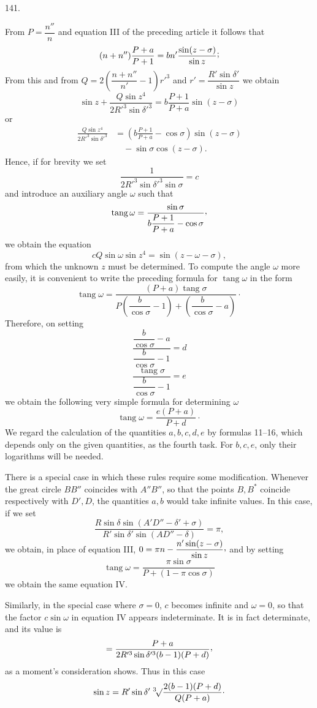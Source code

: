 \par{}\medskip
\begin{center}\hypertarget{native-189-article141}{}141.\end{center}
From $P=\dfrac{n''}{n}$ and equation III of the preceding article it follows that
\[
(n+n'')\frac{P+a}{P+1}=bn'\frac{\sin(z-\sigma)}{\sin z}\mathpunct{\raisebox{.45ex}{;}}
\]
From this and from $Q=2\left(\dfrac{n+n''}{n'}-1\right)r'^3$ and $r'=\dfrac{R'\sin\delta'}{\sin z}$ we obtain
\[
\sin z+\frac{Q\sin z^4}{2R'^3\sin\delta'^3}=b\frac{P+1}{P+a}\sin(z-\sigma)
\]
or
\[
\begin{aligned}
\frac{Q\sin z^4}{2R'^3\sin\delta'^3}&=\left(b\frac{P+1}{P+a}-\cos\sigma\right)\sin(z-\sigma)\\[.5ex]
&\quad-\sin\sigma\cos(z-\sigma).
\end{aligned}
\]
Hence, if for brevity we set
\[
\tag*{14)}\frac{1}{2R'^3\sin\delta'^3\sin\sigma}=c
\]
and introduce an auxiliary angle $\omega$ such that
\[
\operatorname{tang}\omega=\frac{\sin\sigma}{b\dfrac{P+1}{P+a}-\cos\sigma}\mathpunct{\raisebox{.45ex}{,}}
\]
we obtain the equation
\[
\tag*{IV.}cQ\sin\omega\sin z^4=\sin(z-\omega-\sigma),
\]
from which the unknown $z$ must be determined. To compute the angle $\omega$ more easily, it is convenient to write the preceding formula for $\operatorname{tang}\omega$ in the form
\[
\operatorname{tang}\omega=\frac{(P+a)\operatorname{tang}\sigma}{P\left(\dfrac{b}{\cos\sigma}-1\right)+\left(\dfrac{b}{\cos\sigma}-a\right)}\mathpunct{\cdot}
\]
Therefore, on setting
\[
\tag*{15)}\frac{\dfrac{b}{\cos\sigma}-a}{\dfrac{b}{\cos\sigma}-1}=d
\]
\[
\tag*{16)}\frac{\operatorname{tang}\sigma}{\dfrac{b}{\cos\sigma}-1}=e
\]
we obtain the following very simple formula for determining $\omega$
\[
\operatorname{tang}\omega=\frac{e(P+a)}{P+d}\mathpunct{\cdot}
\]
We regard the calculation of the quantities $a,b,c,d,e$ by formulas 11–16, which depends only on the given quantities, as the fourth task. For $b,c,e$, only their logarithms will be needed.

There is a special case in which these rules require some modification. Whenever the great circle $BB''$ coincides with $A''B''$, so that the points $B,B^\ast$ coincide respectively with $D',D$, the quantities $a,b$ would take infinite values. In this case, if we set
\[
\frac{R\sin\delta\sin(A'D''-\delta'+\sigma)}{R'\sin\delta'\sin(AD''-\delta)}=\pi,
\]
we obtain, in place of equation III, $0=\pi n-\dfrac{n'\sin(z-\sigma)}{\sin z}\mathpunct{\raisebox{.45ex}{,}}$ and by setting
\[
\operatorname{tang}\omega=\frac{\pi\sin\sigma}{P+(1-\pi\cos\sigma)}
\]
we obtain the same equation IV.

Similarly, in the special case where $\sigma=0$, $c$ becomes infinite and $\omega=0$, so that the factor $c\sin\omega$ in equation IV appears indeterminate. It is in fact determinate, and its value is
\[
=\frac{P+a}{2R'^3\sin\delta'^3(b-1)(P+d)}\mathpunct{\raisebox{.45ex}{,}}
\]
as a moment's consideration shows. Thus in this case
\[
\sin z=R'\sin\delta'\;\BareRoot[3]{\frac{2(b-1)(P+d)}{Q(P+a)}}\mathpunct{\cdot}
\]
